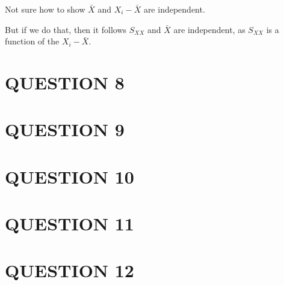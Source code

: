 \documentclass[a4paper]{article}
\begin{document}
Not sure how to show $ \bar{X} $ and $ X_{i} - \bar{X} $ are independent. 

But if we do that, then it follows $ S_{XX} $ and $ \bar{X} $ are independent, as $ S_{XX} $ is a function of the $ X_{i} - \bar{X} $.


\section{QUESTION 8}
\section{QUESTION 9}
\section{QUESTION 10}
\section{QUESTION 11}
\section{QUESTION 12}
\end{document}
